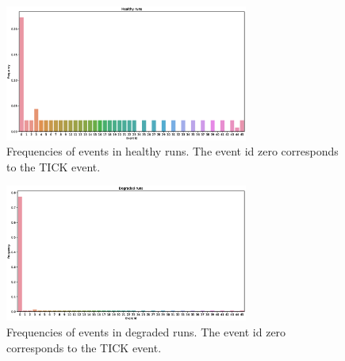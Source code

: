 \documentclass[journal]{IEEEtran}
\begin{document}
\begin{figure}[tb]
 \centering
 \includegraphics[width=8cm,keepaspectratio=true]{./healthy_runs_data_histogram.eps}
 \caption{Frequencies of events in healthy runs. The event id zero corresponds to the TICK event.}
 \label{figure:healthy_histogram}
\end{figure}

\begin{figure}[tb]
 \centering
 \includegraphics[width=8cm,keepaspectratio=true]{./degraded_runs_data_histogram.eps}
 \caption{Frequencies of events in degraded runs. The event id zero corresponds to the TICK event.}
 \label{figure:degraded_histogram}
\end{figure}
\end{document}
